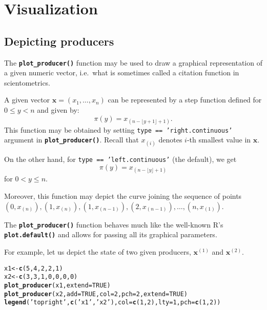 \documentclass[11pt]{article}\usepackage{graphicx, color}
\makeatletter
\newcommand{\hlfunctioncall}[1]{\textcolor[rgb]{0.501960784313725,0,0.329411764705882}{\textbf{#1}}}%
\newcommand{\hlstring}[1]{\textcolor[rgb]{0.6,0.6,1}{#1}}%
\newenvironment{kframe}{%
 \def\at@end@of@kframe{}%
 \ifinner\ifhmode%
  \def\at@end@of@kframe{\end{minipage}}%
  \begin{minipage}{\columnwidth}%
 \fi\fi%
 \def\FrameCommand##1{\hskip\@totalleftmargin \hskip-\fboxsep
 \colorbox{shadecolor}{##1}\hskip-\fboxsep
     \hskip-\linewidth \hskip-\@totalleftmargin \hskip\columnwidth}%
 \MakeFramed {\advance\hsize-\width
   \@totalleftmargin\z@ \linewidth\hsize
   \@setminipage}}%
 {\par\unskip\endMakeFramed%
 \at@end@of@kframe}
\newenvironment{knitrout}{}{} %
\newcommand{\lang}[1]{\textsf{#1}\xspace}
\newcommand{\R}{\lang{R}}
\newcommand{\Rfunc}[1]{\texttt{\hlfunctioncall{#1}}}
\newcommand{\vect}[1]{{\mathbf{#1}}}
\theoremstyle{remark}
\theoremstyle{definition}
\makeatother
\begin{document}
\section{Visualization}


\subsection{Depicting producers}

The \Rfunc{plot\_producer()} function may be used to draw
a graphical representation of a given numeric vector,
i.e.~what is sometimes called a citation function in scientometrics.

A given vector $\mathbf{x}=(x_1,\dots,x_n)$ can be represented by a
step function defined for $0\le y<n$ and given by:
\[
   \pi(y)=x_{(n-\lfloor y+1\rfloor+1)}.
\]
This function may be obtained by setting \texttt{type == 'right.continuous'}
argument in \Rfunc{plot\_pro\-du\-cer()}.
Recall that $x_{(i)}$ denotes $i$-th smallest value in $\vect{x}$.

On the other hand, for \texttt{type == 'left.continuous'}
(the default), we get
\[
\pi(y)=x_{(n-\lfloor y\rfloor+1)}
\]
for $0< y\le n$.

Moreover, this function may depict the curve joining the sequence
of points $(0, x_{(n)}), (1, x_{(n)}),\allowbreak (1, x_{(n-1)}), (2, x_{(n-1)}),
\dots, (n, x_{(1)})$.


\medskip
The \Rfunc{plot\_producer()} function behaves much like
the well-known \R's \Rfunc{plot.default()} and allows for passing
all its graphical parameters.

For example, let us depict the state of two given producers,
$\vect{x}^{(1)}$ and $\vect{x}^{(2)}$.

\begin{knitrout}\small
{}\color{fgcolor}\begin{kframe}
\begin{alltt}
x1 <- \hlfunctioncall{c}(5, 4, 2, 2, 1)
x2 <- \hlfunctioncall{c}(3, 3, 1, 0, 0, 0, 0)
\hlfunctioncall{plot_producer}(x1, extend=TRUE)
\hlfunctioncall{plot_producer}(x2, add=TRUE, col=2, pch=2, extend=TRUE)
\hlfunctioncall{legend}(\hlstring{'topright'}, \hlfunctioncall{c}(\hlstring{'x1'}, \hlstring{'x2'}), col=\hlfunctioncall{c}(1, 2), lty=1, pch=\hlfunctioncall{c}(1, 2))
\end{alltt}
\end{kframe}
\end{knitrout}
\end{document}
